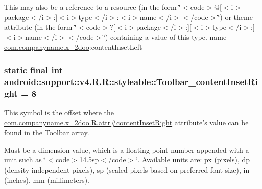 This may also be a reference to a resource (in the form \char`\"{}$<$code$>$@\mbox{[}$<$i$>$package$<$/i$>$:\mbox{]}$<$i$>$type$<$/i$>$:$<$i$>$name$<$/i$>$$<$/code$>$\char`\"{}) or theme attribute (in the form \char`\"{}$<$code$>$?\mbox{[}$<$i$>$package$<$/i$>$:\mbox{]}\mbox{[}$<$i$>$type$<$/i$>$:\mbox{]}$<$i$>$name$<$/i$>$$<$/code$>$\char`\"{}) containing a value of this type.  name \hyperlink{namespacecom_1_1companyname_1_1x__2doo}{com.companyname.x\_\-2doo}:contentInsetLeft \hypertarget{classandroid_1_1support_1_1v4_1_1_r_1_1styleable_ec6d939ba7f23b71e3f71aaffe7cde62}{
\subsubsection[{Toolbar\_\-contentInsetRight}]{\setlength{\rightskip}{0pt plus 5cm}static final int android::support::v4.R.R::styleable::Toolbar\_\-contentInsetRight = 8}}
\label{classandroid_1_1support_1_1v4_1_1_r_1_1styleable_ec6d939ba7f23b71e3f71aaffe7cde62}


This symbol is the offset where the \hyperlink{classcom_1_1companyname_1_1x__2doo_1_1_r_1_1attr_3801fe95544dbee5dc1389c679f984f6}{com.companyname.x\_\-2doo.R.attr\#contentInsetRight} attribute's value can be found in the \hyperlink{classandroid_1_1support_1_1v4_1_1_r_1_1styleable_0646d71cfbd4a8645c7d805b33e1c574}{Toolbar} array.

Must be a dimension value, which is a floating point number appended with a unit such as \char`\"{}$<$code$>$14.5sp$<$/code$>$\char`\"{}. Available units are: px (pixels), dp (density-independent pixels), sp (scaled pixels based on preferred font size), in (inches), mm (millimeters). 

